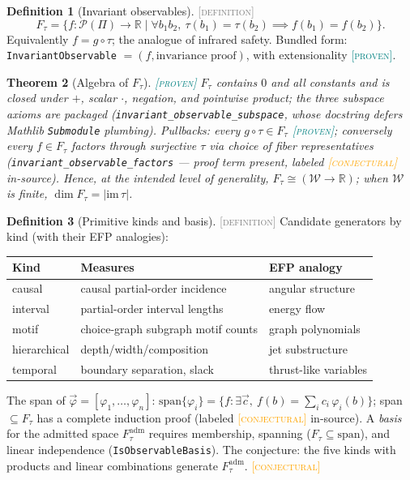 \documentclass[11pt]{article}
\newcommand{\PROVEN}{\textcolor{teal}{\textsc{[proven]}}}
\newcommand{\DEFINITION}{\textcolor{gray}{\textsc{[definition]}}}
\newcommand{\CONJECTURAL}{\textcolor{orange}{\textsc{[conjectural]}}}
\newcommand{\PT}{\Pi}                          %
\newcommand{\PS}{\mathcal{P}(\PT)}             %
\newcommand{\WS}{\mathcal{W}}                  %
\newcommand{\tmap}{\tau}                       %
\newcommand{\R}{\mathbb{R}}
\theoremstyle{plain}
\newtheorem{theorem}{Theorem}[section]
\theoremstyle{definition}
\newtheorem{definition}[theorem]{Definition}
\begin{document}
\begin{definition}[Invariant observables]\DEFINITION\;
\[
  F_\tmap
  = \{ f : \PS \to \R \mid
       \forall b_1 b_2,\ \tmap(b_1) = \tmap(b_2) \implies f(b_1) = f(b_2) \}.
\]
Equivalently $f = g \circ \tmap$; the analogue of infrared safety. Bundled
form: \texttt{InvariantObservable} $= (f, \text{invariance proof})$, with
extensionality \PROVEN.
\end{definition}

\begin{theorem}[Algebra of $F_\tmap$]\PROVEN\;
$F_\tmap$ contains $0$ and all constants and is closed under $+$, scalar
$\cdot$, negation, and pointwise product; the three subspace axioms are
packaged (\texttt{invariant\_observable\_subspace}, whose docstring defers
Mathlib \texttt{Submodule} plumbing). Pullbacks: every $g \circ \tmap \in
F_\tmap$ \PROVEN; conversely every $f \in F_\tmap$ factors through
surjective $\tmap$ via choice of fiber representatives
(\texttt{invariant\_observable\_factors} --- proof term present, labeled
\CONJECTURAL{} in-source). Hence, at the intended level of generality,
$F_\tmap \cong (\WS \to \R)$; when $\WS$ is finite,
$\dim F_\tmap = |\mathrm{im}\,\tmap|$.
\end{theorem}

\begin{definition}[Primitive kinds and basis]\DEFINITION\;
Candidate generators by kind (with their EFP analogies):
\begin{center}
\begin{tabular}{@{}lll@{}}
\toprule
Kind & Measures & EFP analogy \\
\midrule
causal        & causal partial-order incidence      & angular structure \\
interval      & partial-order interval lengths      & energy flow \\
motif         & choice-graph subgraph motif counts  & graph polynomials \\
hierarchical  & depth/width/composition             & jet substructure \\
temporal      & boundary separation, slack          & thrust-like variables \\
\bottomrule
\end{tabular}
\end{center}
The span of $\vec{\varphi} = [\varphi_1, \dots, \varphi_n]$:
$\mathrm{span}\{\varphi_i\} = \{ f : \exists \vec{c},\
f(b) = \sum_i c_i\,\varphi_i(b) \}$; span $\subseteq F_\tmap$ has a complete
induction proof (labeled \CONJECTURAL{} in-source). A \emph{basis} for the
admitted space $F^{\mathrm{adm}}_\tmap$ requires membership, spanning
($F_\tmap \subseteq \mathrm{span}$), and linear independence
(\texttt{IsObservableBasis}). The conjecture: the five kinds with products
and linear combinations generate $F^{\mathrm{adm}}_\tmap$. \CONJECTURAL
\end{definition}
\end{document}
